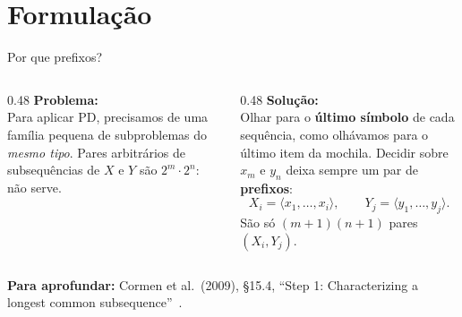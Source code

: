 \documentclass[aspectratio=169,xcolor=table]{beamer}
\newcommand{\fonte}[1]{%
  \vfill
  {\tiny\color{gray!55!black}\textbf{Para aprofundar:} #1\par}%
}
\begin{document}
\section{Formulação}

\begin{frame}{Por que prefixos?}
  \begin{columns}[T]
    \begin{column}{0.48\textwidth}
      \textbf{Problema:}\\[2pt]
      \scriptsize Para aplicar PD, precisamos de uma família pequena de subproblemas do
      \emph{mesmo tipo}. Pares arbitrários de subsequências de $X$ e $Y$ são
      $2^m\cdot 2^n$: não serve.
    \end{column}
    \begin{column}{0.48\textwidth}
      \textbf{Solução:}\\[2pt]
      \scriptsize Olhar para o \textbf{último símbolo} de cada sequência, como olhávamos para
      o último item da mochila. Decidir sobre $x_m$ e $y_n$ deixa sempre um par de
      \textbf{prefixos}:
      \[ X_i = \langle x_1,\dots,x_i\rangle,\qquad Y_j = \langle y_1,\dots,y_j\rangle. \]
      São só $(m+1)(n+1)$ pares $(X_i, Y_j)$.
    \end{column}
  \end{columns}
  \medskip
  \begin{center}
  \end{center}
  \fonte{Cormen et al.\ (2009), \S 15.4, ``Step 1: Characterizing a longest common
    subsequence''~\cite{cormen2009introduction}.}
\end{frame}
\end{document}
